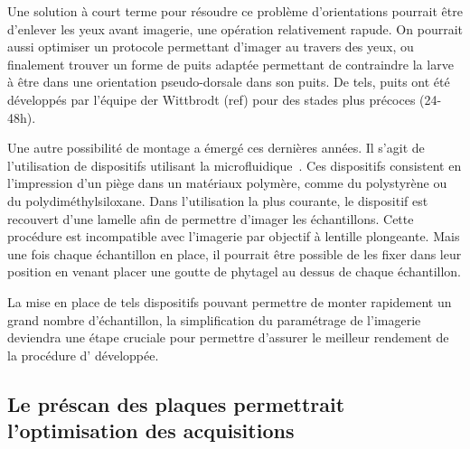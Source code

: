 \documentclass[\main/main.tex]{subfiles}
\begin{document}
%
Une solution à court terme pour résoudre ce problème d'orientations pourrait être d'enlever les yeux avant imagerie, une opération relativement rapude. On pourrait aussi optimiser un protocole permettant d'imager au travers des yeux, ou finalement trouver un forme de puits adaptée permettant de contraindre la larve à être dans une orientation pseudo-dorsale dans son puits. De tels, puits ont été développés par l'équipe der Wittbrodt (ref) pour des stades plus précoces (24-48h).

%
Une autre possibilité de montage a émergé  ces dernières années.
%
Il s'agit de l'utilisation de dispositifs utilisant la microfluidique~\cite{khalili_2019}.
%
Ces dispositifs consistent en l'impression d'un piège dans un matériaux polymère, comme du polystyrène ou du polydiméthylsiloxane.
%
Dans l'utilisation la plus courante, le dispositif est recouvert d'une lamelle afin de permettre d'imager les échantillons.
%
Cette procédure est incompatible avec l'imagerie par objectif à lentille plongeante.
%
Mais une fois chaque échantillon en place,
il pourrait être possible de les fixer dans leur position en venant placer une goutte de phytagel au dessus de chaque échantillon.
%

La mise en place de tels dispositifs pouvant permettre de monter rapidement un grand nombre d'échantillon,
la simplification du paramétrage de l'imagerie deviendra une étape cruciale pour permettre d'assurer le meilleur rendement de la procédure d'\hti{} développée.

    \subsection{Le préscan des plaques permettrait l'optimisation des acquisitions}
\end{document}
